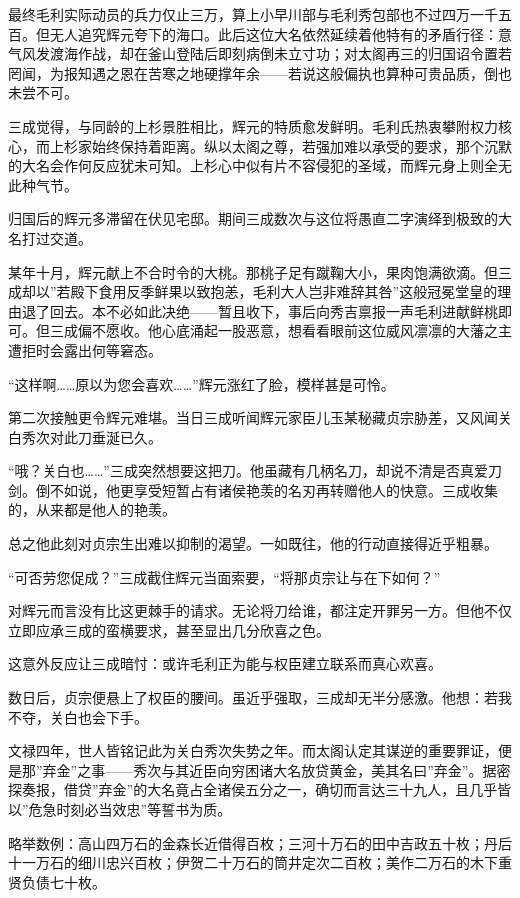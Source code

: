 \documentclass[
]{article}
\begin{document}
最终毛利实际动员的兵力仅止三万，算上小早川部与毛利秀包部也不过四万一千五百。但无人追究辉元夸下的海口。此后这位大名依然延续着他特有的矛盾行径：意气风发渡海作战，却在釜山登陆后即刻病倒未立寸功；对太阁再三的归国诏令置若罔闻，为报知遇之恩在苦寒之地硬撑年余------若说这般偏执也算种可贵品质，倒也未尝不可。

三成觉得，与同龄的上杉景胜相比，辉元的特质愈发鲜明。毛利氏热衷攀附权力核心，而上杉家始终保持着距离。纵以太阁之尊，若强加难以承受的要求，那个沉默的大名会作何反应犹未可知。上杉心中似有片不容侵犯的圣域，而辉元身上则全无此种气节。

归国后的辉元多滞留在伏见宅邸。期间三成数次与这位将愚直二字演绎到极致的大名打过交道。

某年十月，辉元献上不合时令的大桃。那桃子足有蹴鞠大小，果肉饱满欲滴。但三成却以''若殿下食用反季鲜果以致抱恙，毛利大人岂非难辞其咎''这般冠冕堂皇的理由退了回去。本不必如此决绝------暂且收下，事后向秀吉禀报一声毛利进献鲜桃即可。但三成偏不愿收。他心底涌起一股恶意，想看看眼前这位威风凛凛的大藩之主遭拒时会露出何等窘态。

``这样啊\ldots\ldots 原以为您会喜欢\ldots\ldots{}''辉元涨红了脸，模样甚是可怜。

第二次接触更令辉元难堪。当日三成听闻辉元家臣儿玉某秘藏贞宗胁差，又风闻关白秀次对此刀垂涎已久。

``哦？关白也\ldots\ldots{}''三成突然想要这把刀。他虽藏有几柄名刀，却说不清是否真爱刀剑。倒不如说，他更享受短暂占有诸侯艳羡的名刃再转赠他人的快意。三成收集的，从来都是他人的艳羡。

总之他此刻对贞宗生出难以抑制的渴望。一如既往，他的行动直接得近乎粗暴。

``可否劳您促成？''三成截住辉元当面索要，``将那贞宗让与在下如何？''

对辉元而言没有比这更棘手的请求。无论将刀给谁，都注定开罪另一方。但他不仅立即应承三成的蛮横要求，甚至显出几分欣喜之色。

这意外反应让三成暗忖：或许毛利正为能与权臣建立联系而真心欢喜。

数日后，贞宗便悬上了权臣的腰间。虽近乎强取，三成却无半分感激。他想：若我不夺，关白也会下手。

文禄四年，世人皆铭记此为关白秀次失势之年。而太阁认定其谋逆的重要罪证，便是那''弃金''之事------秀次与其近臣向穷困诸大名放贷黄金，美其名曰''弃金''。据密探奏报，借贷''弃金''的大名竟占全诸侯五分之一，确切而言达三十九人，且几乎皆以''危急时刻必当效忠''等誓书为质。

略举数例：高山四万石的金森长近借得百枚；三河十万石的田中吉政五十枚；丹后十一万石的细川忠兴百枚；伊贺二十万石的筒井定次二百枚；美作二万石的木下重贤负债七十枚。
\end{document}
